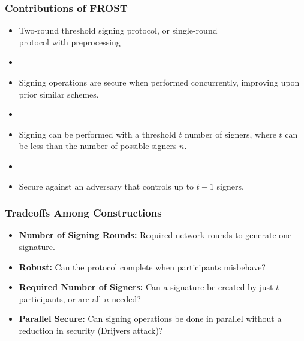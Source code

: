 \documentclass[hyperref={pdfpagelabels=true},table,dvipsnames,14pt,aspectratio=169]{beamer}
\begin{document}
\begin{frame}

\end{frame}

\begin{frame}
  \frametitle{Contributions of FROST}

  \begin{itemize}
    \item<1-> Two-round threshold signing protocol, or single-round \\ protocol with
    preprocessing
    \item[]
    \item<2-> Signing operations are secure when performed concurrently,
      improving upon prior similar schemes.
    \item[]
    \item<3-> Signing can be performed with a threshold $t$ number of signers,
      where $t$ can be less than the number of possible signers $n$.
    \item[]
    \item<4-> Secure against an adversary that controls up to $t-1$ signers.
  \end{itemize}
\end{frame}


\begin{frame}
  \frametitle{Tradeoffs Among Constructions}

  \begin{itemize}
    \item<1-> \textbf{Number of Signing Rounds:} Required network rounds to
      generate one signature.
    \item<2-> \textbf{Robust:} Can the protocol complete when participants
      misbehave?
    \item<3-> \textbf{Required Number of Signers:} Can a signature be
    created by just $t$ participants, or are all $n$ needed?
    \item<4-> \textbf{Parallel Secure:} Can signing operations be done in
      parallel without a reduction in security (Drijvers attack)?
  \end{itemize}
\end{frame}
\end{document}

